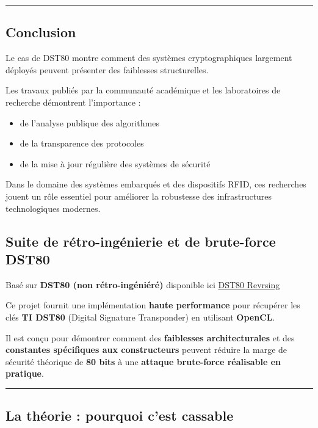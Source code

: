 \documentclass[
  french,
]{article}
\providecommand{\tightlist}{%
  \setlength{\itemsep}{0pt}\setlength{\parskip}{0pt}}
\begin{document}
\begin{center}\rule{0.5\linewidth}{0.5pt}\end{center}

\subsection{Conclusion}\label{conclusion-3}

Le cas de DST80 montre comment des systèmes cryptographiques largement
déployés peuvent présenter des faiblesses structurelles.

Les travaux publiés par la communauté académique et les laboratoires de
recherche démontrent l'importance :

\begin{itemize}
\tightlist
\item
  de l'analyse publique des algorithmes
\item
  de la transparence des protocoles
\item
  de la mise à jour régulière des systèmes de sécurité
\end{itemize}

Dans le domaine des systèmes embarqués et des dispositifs RFID, ces
recherches jouent un rôle essentiel pour améliorer la robustesse des
infrastructures technologiques modernes.

\subsection{Suite de rétro-ingénierie et de brute-force
DST80}\label{suite-de-ruxe9tro-inguxe9nierie-et-de-brute-force-dst80}

Basé sur \textbf{DST80 (non rétro-ingéniéré)} disponible ici
\href{https://github.com/bbaranoff/dst80_reversing}{DST80 Revrsing}

Ce projet fournit une implémentation \textbf{haute performance} pour
récupérer les clés \textbf{TI DST80} (Digital Signature Transponder) en
utilisant \textbf{OpenCL}.

Il est conçu pour démontrer comment des \textbf{faiblesses
architecturales} et des \textbf{constantes spécifiques aux
constructeurs} peuvent réduire la marge de sécurité théorique de
\textbf{80 bits} à une \textbf{attaque brute-force réalisable en
pratique}.

\begin{center}\rule{0.5\linewidth}{0.5pt}\end{center}

\subsection{La théorie : pourquoi c'est
cassable}\label{la-thuxe9orie-pourquoi-cest-cassable}
\end{document}
